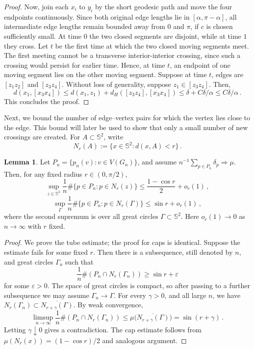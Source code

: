 \documentclass[reqno, 11pt]{amsart}
\theoremstyle{definition}
\newtheorem{lemma}{Lemma}
\begin{document}
\begin{proof}
Now, join each \(x_i\) to \(y_i\) by the short geodesic path and move the four endpoints continuously.  Since both original edge lengths lie in \([\alpha,\pi-\alpha]\), all intermediate edge lengths remain bounded away from \(0\) and \(\pi\), if \(c\) is chosen sufficiently small.  At time \(0\) the two closed segments are disjoint, while at time \(1\) they cross.  Let \(t\) be the first time at which the two closed moving segments meet.  The first meeting cannot be a transverse interior-interior crossing, since such a crossing would persist for earlier time.  Hence, at time \(t\), an endpoint of one moving segment lies on the other moving segment. Suppose at time $t$, edges are $[z_1z_2]$ and $[z_3z_4]$. Without loss of generality, suppose $z_1 \in [z_3z_4]$. Then,
\[
        d(x_1,[x_3x_4])
        \le d(x_1,z_1)
             +d_H([z_3z_4],[x_3x_4])
        \le \delta+C{\delta}/{\alpha}
        \le C{\delta}/{\alpha}\,.
\]
This concludes the proof.
\end{proof}

Next, we bound the number of edge–vertex pairs for which the vertex lies close to the edge. This bound will later be used to show that only a small number of new crossings are created. For \(A\subset {\mathbb S}^2\), write
\[
        N_r(A):=\{x\in{\mathbb S}^2:d(x,A)<r\}\,.
\]
\begin{lemma}\label{lem:reduction-uniform-counts}
Let \(P_n=\{p_n(v):v\in V(G_n)\}\), and assume \(n^{-1}\sum_{p\in P_n}\delta_p\Rightarrow\mu\).  Then, for any fixed radius \(r\in(0,\pi/2)\),
\begin{equation}\label{eq:reduction-uniform-cap-count}
        \sup_{z\in{\mathbb S}^2}
        \frac1n\#\{p\in P_n: p \in N_r(z)\}
        \le
        \frac{1-\cos r}{2}+o_r(1)\,,
\end{equation}
\begin{equation}\label{eq:reduction-uniform-tube-count}
        \sup_{\Gamma}
        \frac1n\#\{p\in P_n:p\in N_r(\Gamma)\}
        \le
        \sin r+o_r(1)\,,
\end{equation}
where the second supremum is over all great circles \(\Gamma\subset{\mathbb S}^2\).  Here \(o_r(1)\to0\) as \(n\to\infty\) with \(r\) fixed.
\end{lemma}

\begin{proof}
We prove the tube estimate; the proof for caps is identical.  Suppose the estimate fails for some fixed \(r\).  Then there is a subsequence, still denoted by \(n\), and great circles \(\Gamma_n\) such that
\[
        \frac1n\#(P_n\cap N_r(\Gamma_n))
        \ge \sin r+\varepsilon
\]
for some \(\varepsilon>0\).  The space of great circles is compact, so after passing to a further subsequence we may assume \(\Gamma_n\to\Gamma\).  For every \(\gamma>0\), and all large \(n\), we have $ N_r(\Gamma_n)\subset \overline{N_{r+\gamma}(\Gamma)}$. By weak convergence,
\[
        \limsup_{n\to\infty}\frac1n\#(P_n\cap N_r(\Gamma_n))
        \le
        \mu\bigl(\overline{N_{r+\gamma}(\Gamma)}\bigr)
        =\sin(r+\gamma)\,.
\]
Letting \(\gamma\downarrow0\) gives a contradiction.  The cap estimate follows from  $\mu(N_r(x)) = (1-\cos r)/2$ and analogous argument.
\end{proof}
\end{document}
